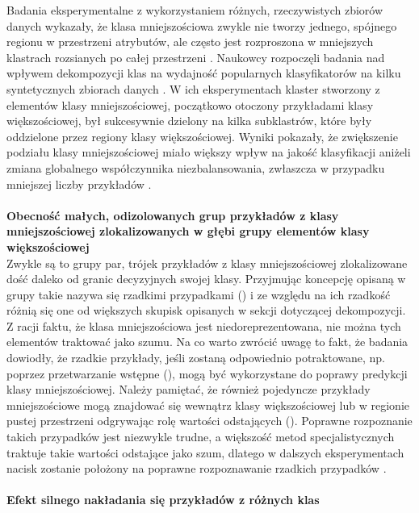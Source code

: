 \noindent Badania eksperymentalne z wykorzystaniem różnych, rzeczywistych zbiorów danych wykazały, że klasa mniejszościowa zwykle nie tworzy jednego, spójnego regionu w przestrzeni atrybutów, ale często jest rozproszona w mniejszych klastrach rozsianych po całej przestrzeni \cite{Book:DataDistribution}\cite{Article:DataDistribution2}\cite{Inbook:DataDistribution}. Naukowcy rozpoczęli badania nad wpływem dekompozycji klas na wydajność popularnych klasyfikatorów na kilku syntetycznych zbiorach danych \cite{Article:DataDistribution}. W ich eksperymentach klaster stworzony z elementów klasy mniejszościowej, początkowo otoczony przykładami klasy większościowej, był sukcesywnie dzielony na kilka subklastrów, które były oddzielone przez regiony klasy większościowej. Wyniki pokazały, że zwiększenie podziału klasy mniejszościowej miało większy wpływ na jakość klasyfikacji aniżeli zmiana globalnego współczynnika niezbalansowania, zwłaszcza w przypadku mniejszej liczby przykładów \cite{Article:TypyPrzykladow}.\\\\
\textbf{Obecność małych, odizolowanych grup przykładów z klasy mniejszościowej zlokalizowanych w głębi grupy elementów klasy większościowej}\\

\noindent Zwykle są to grupy par, trójek przykładów z klasy mniejszościowej zlokalizowane dość daleko od granic decyzyjnych swojej klasy. Przyjmując koncepcję opisaną w \cite{Article:DataDistribution3} grupy takie nazywa się rzadkimi przypadkami () i ze względu na ich rzadkość różnią się one od większych skupisk opisanych w sekcji dotyczącej dekompozycji. Z racji faktu, że klasa mniejszościowa jest niedoreprezentowana, nie można tych elementów traktować jako szumu. Na co warto zwrócić uwagę to fakt, że badania \cite{Article:DataDistribution2} dowiodły, że rzadkie przykłady, jeśli zostaną odpowiednio potraktowane, np. poprzez przetwarzanie wstępne (), mogą być wykorzystane do poprawy predykcji klasy mniejszościowej. Należy pamiętać, że również pojedyncze przykłady mniejszościowe mogą znajdować się wewnątrz klasy większościowej lub w regionie pustej przestrzeni odgrywając rolę wartości odstających (). Poprawne rozpoznanie takich przypadków jest niezwykle trudne, a większość metod specjalistycznych traktuje takie wartości odstające jako szum, dlatego w dalszych eksperymentach nacisk zostanie położony na poprawne rozpoznawanie rzadkich przypadków \cite{Article:TypyPrzykladow}.\\\\
\textbf{Efekt silnego nakładania się przykładów z różnych klas}\\

